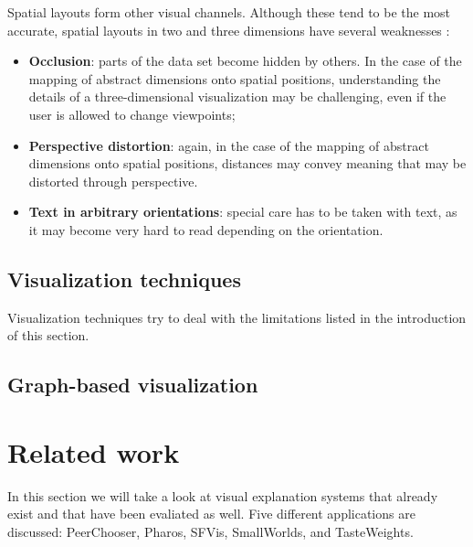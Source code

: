 Spatial layouts form other visual channels. Although these tend to be the most accurate, spatial layouts in two and three dimensions have several weaknesses \cite{shirley:2009}:

\begin{itemize}
	\item \textbf{Occlusion}: parts of the data set become hidden by others. In the case of the mapping of abstract dimensions onto spatial positions, understanding the details of a three-dimensional visualization may be challenging, even if the user is allowed to change viewpoints;
	\item \textbf{Perspective distortion}: again, in the case of the mapping of abstract dimensions onto spatial positions, distances may convey meaning that may be distorted through perspective.
	\item \textbf{Text in arbitrary orientations}: special care has to be taken with text, as it may become very hard to read depending on the orientation.
\end{itemize}


\subsection{Visualization techniques}\label{chapter:literature_study:section:interaction:subsection:techniques}


Visualization techniques try to deal with the limitations listed in the introduction of this section.



\subsection{Graph-based visualization}\label{chapter:literature_study:section:interaction:subsection:graphs}







% 
\section{Related work}\label{chapter:survey:section:applications}

In this section we will take a look at visual explanation systems that already exist and that have been evaliated as well. Five different applications are discussed: PeerChooser, Pharos, SFVis, SmallWorlds, and TasteWeights.

